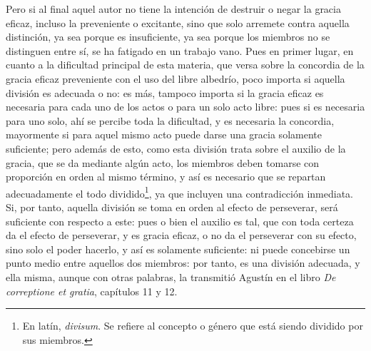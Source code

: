 \documentclass{article}
\begin{document}
Pero si al final aquel autor no tiene la intención de destruir o negar la gracia eficaz,
incluso la preveniente o excitante, sino que solo arremete contra aquella distinción, ya
sea porque es insuficiente, ya sea porque los miembros no se distinguen entre sí, se ha
fatigado en un trabajo vano. Pues en primer lugar, en cuanto a la dificultad principal
de esta materia, que versa sobre la concordia de la gracia eficaz preveniente con el uso
del libre albedrío, poco importa si aquella división es adecuada o no: es más, tampoco
importa si la gracia eficaz es necesaria para cada uno de los actos o para un solo acto
libre: pues si es necesaria para uno solo, ahí se percibe toda la dificultad, y es
necesaria la concordia, mayormente si para aquel mismo acto puede darse una gracia
solamente suficiente; pero además de esto, como esta división trata sobre el auxilio de
la gracia, que se da mediante algún acto, los miembros deben tomarse con proporción en
orden al mismo término, y así es necesario que se repartan adecuadamente el todo
dividido\footnote{En latín, \textit{divisum}. Se refiere al concepto o género que está
siendo dividido por sus miembros.}, ya que incluyen una contradicción inmediata. Si, por
tanto, aquella división se toma en orden al efecto de perseverar, será suficiente con
respecto a este: pues o bien el auxilio es tal, que con toda certeza da el efecto de
perseverar, y es gracia eficaz, o no da el perseverar con su efecto, sino solo el poder
hacerlo, y así es solamente suficiente: ni puede concebirse un punto medio entre
aquellos dos miembros: por tanto, es una división adecuada, y ella misma, aunque con
otras palabras, la transmitió Agustín en el libro \textit{De correptione et gratia},
capítulos 11 y 12.
\end{document}
